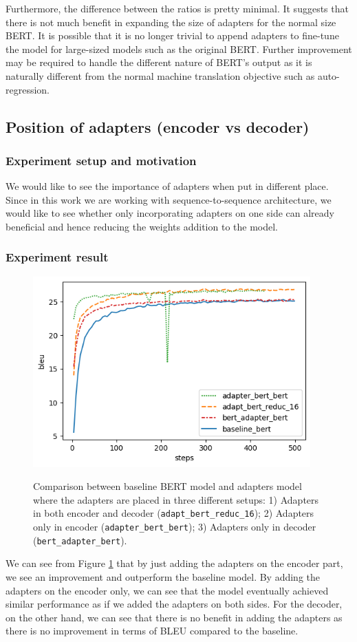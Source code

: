 Furthermore, the difference between the ratios is pretty minimal. It suggests that there is not much benefit in expanding the size of adapters for the normal size BERT. It is possible that it is no longer trivial to append adapters to fine-tune the model for large-sized models such as the original BERT. Further improvement may be required to handle the different nature of BERT's output as it is naturally different from the normal machine translation objective such as auto-regression.

\subsection{Position of adapters (encoder vs decoder)}
\label{sec:posada}
\subsubsection{Experiment setup and motivation}
We would like to see the importance of adapters when put in different place. Since in this work we are working with sequence-to-sequence architecture, we would like to see whether only incorporating adapters on one side can already beneficial and hence reducing the weights addition to the model.

\subsubsection{Experiment result}
\begin{figure}[]
    {\includegraphics[width=0.95\textwidth]{img/bert_pos.png}}
    \centering
    \caption{Comparison between baseline BERT model and adapters model where the adapters are placed in three different setups: 1) Adapters in both encoder and decoder (\texttt{adapt\_bert\_reduc\_16}); 2) Adapters only in encoder (\texttt{adapter\_bert\_bert}); 3) Adapters only in decoder (\texttt{bert\_adapter\_bert}).}
    \label{img:adapt_bert_pos}
\end{figure}
We can see from Figure \ref{img:adapt_bert_pos} that by just adding the adapters on the encoder part, we see an improvement and outperform the baseline model. By adding the adapters on the encoder only, we can see that the model eventually achieved similar performance as if we added the adapters on both sides. For the decoder, on the other hand, we can see that there is no benefit in adding the adapters as there is no improvement in terms of BLEU compared to the baseline.

